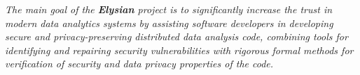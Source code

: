 \documentclass[a4paper,11pt]{article}
\newcommand{\project}[1]{\textbf{#1}\xspace}
\newcommand{\SECURITY}{\project{Elysian}}
\newcommand{\TheProject}{\SECURITY}
\begin{document}

\begin{mdframed}[backgroundcolor=blue!5]
\emph{The main goal of the \TheProject{} project is to significantly increase the trust in modern data analytics systems by assisting software developers in developing secure and privacy-preserving distributed data analysis code, combining tools for identifying and repairing security vulnerabilities with rigorous formal methods for verification of security and data privacy properties of the code.}
\end{mdframed}
\end{document}
